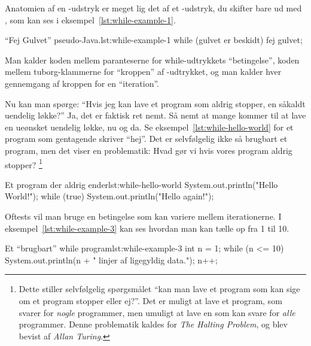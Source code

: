 
		Anatomien af en -udstryk er meget lig det af et
		-udstryk, du skifter bare  ud med
		, som kan ses i eksempel~\ref{lst:while-example-1}.

		\begin{JavaCode}{``Fej Gulvet'' pseudo-Java.}{lst:while-example-1}
			while (gulvet er beskidt) {
				fej gulvet;
			}
		\end{JavaCode}

		Man kalder koden mellem paranteserne for while-udtrykkets ``betingelse'',
		koden mellem tuborg-klammerne for ``kroppen'' af
		-udtrykket, og man kalder hver gennemgang af kroppen
		for en ``iteration''.

		Nu kan man spørge: ``Hvis jeg kan lave et program som aldrig stopper, en
		såkaldt uendelig løkke?'' Ja, det er faktisk ret nemt. Så nemt at mange
		kommer til at lave en ueønsket uendelig løkke, nu og da. Se
		eksempel~\ref{lst:while-hello-world}
		for et program som gentagende skriver ``hej''. Det er selvfølgelig ikke
		så brugbart et program, men det viser en problematik: Hvad gør vi hvis
		vores program aldrig stopper?  \footnote{Dette stiller selvfølgelig spørgsmålet ``kan man lave et program som kan sige om et program stopper eller ej?''. Det er muligt at lave et program, som svarer for \emph{nogle} programmer, men umuligt at lave en som kan svare for \emph{alle} programmer. Denne problematik kaldes for \emph{The Halting Problem}, og blev bevist af \emph{Allan Turing}.}

		\begin{JavaCode}{Et program der aldrig ender}{lst:while-hello-world}
			System.out.println("Hello World!");
			while (true) {
				System.out.println("Hello again!");
			}
		\end{JavaCode}

		 Oftests vil man bruge
		en betingelse som kan variere mellem iterationerne. I
		eksempel~\ref{lst:while-example-3} kan ses hvordan man kan tælle op fra
		1 til 10.

		\begin{JavaCode}{Et ``brugbart'' while program}{lst:while-example-3}
			int n = 1;
			while (n <= 10) {
				System.out.println(n + " linjer af ligegyldig data.");
				n++;
			}
		\end{JavaCode}

